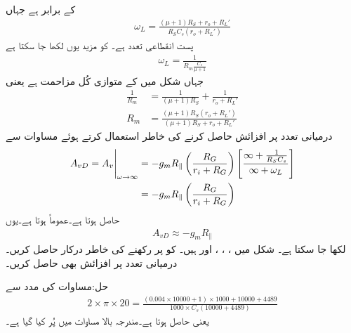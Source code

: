 کے برابر ہے جہاں
\begin{align}\label{مساوات_تعددی_ردعمل_ماسفیٹ_مخارج_کپیسٹر}
\omega_L=\frac{\left(\mu+1 \right)R_S +r_o +R_L'}{R_S C_s \left(r_o +R_L'\right)}
\end{align}
پست انقطاعی تعدد ہے۔ کو مزید یوں لکھا جا سکتا ہے
\begin{align}
\omega_L=\frac{1}{R_m \frac{C_s}{\mu+1}}
\end{align}
جہاں  شکل  میں  کے متوازی کُل مزاحمت ہے یعنی
\begin{align*}
\frac{1}{R_m}&=\frac{1}{\left(\mu+1 \right) R_S}+\frac{1}{r_o+R_L'}\\
R_m&=\frac{\left(\mu+1 \right) R_S \left(r_o+R_L' \right)}{\left(\mu+1 \right)R_S+r_o+R_L'}
\end{align*}
درمیانی تعدد پر افزائش حاصل کرنے کی خاطر  استعمال کرتے ہوئے مساوات   سے
\begin{align*}
A_{vD}=\eval{A_v}_{\omega \to \infty}&=-g_m R_{\mathbin{\|}}\left(\frac{R_G}{r_i+R_G} \right)\left[\frac{\infty+\frac{1}{ R_S C_s}}{\infty+\omega_L}\right] \\
&=-g_m R_{\mathbin{\|}}\left(\frac{R_G}{r_i+R_G} \right)
\end{align*}
حاصل ہوتا ہے۔عموماً  ہوتا ہے۔یوں
\begin{align}\label{مساوات_تعدد_ردعمل_درمیانی_تعدد_پر_افزائش_ماسفیٹ_مخارج_کپیسٹر}
A_{vD} \approx -g_m R_{\mathbin{\|}}
\end{align}
لکھا جا سکتا ہے۔
شکل  میں ، ، ،  اور  ہیں۔ کو  پر رکھنے کی خاطر درکار  حاصل کریں۔درمیانی تعدد پر افزائش  بھی حاصل کریں۔

حل:مساوات  کی مدد سے
\begin{align*}
2 \times \pi \times 20=\frac{\left(0.004 \times 10000+1 \right)\times 1000 +10000 +4489}{1000\times C_s \left(10000 +4489\right)}
\end{align*}
یعنی  حاصل ہوتا ہے۔مندرجہ بالا مساوات میں  پُر کیا گیا ہے۔

